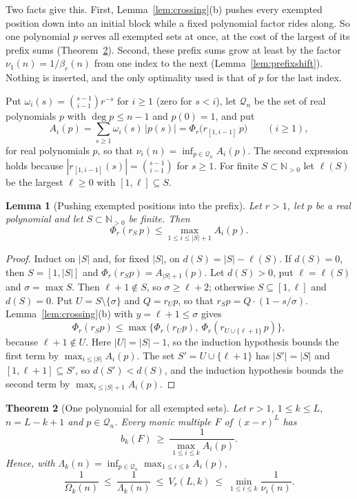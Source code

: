 \documentclass[11pt]{article}
\newtheorem{theorem}{Theorem}[section]
\newtheorem{lemma}[theorem]{Lemma}
\newcommand{\N}{\mathbb N}
\begin{document}
Two facts give this.  First, Lemma~\ref{lem:crossing}(b) pushes every
exempted position down into an initial block while a fixed polynomial factor
rides along.  So one polynomial $p$ serves all exempted sets at once, at the
cost of the largest of its prefix sums (Theorem~\ref{thm:onepoly}).  Second,
these prefix sums grow at least by the factor $\nu_1(n)=1/\beta_r(n)$ from
one index to the next (Lemma~\ref{lem:prefixshift}).  Nothing is inserted,
and the only optimality used is that of $p$ for the last index.

Put $\omega_i(s)=\binom{s-1}{i-1}r^{-s}$ for $i\ge1$ (zero for $s<i$),
let $\mathcal Q_n$ be the set of real polynomials $p$ with
$\deg p\le n-1$ and $p(0)=1$, and put
\[
  A_i(p)=\sum_{s\ge1}\omega_i(s)\,|p(s)|=\Phi_r\bigl(r_{[1,i-1]}\,p\bigr)
  \qquad(i\ge1),
\]
for real polynomials $p$, so that $\nu_i(n)=\inf_{p\in\mathcal Q_n}A_i(p)$.
The second expression holds because $|r_{[1,i-1]}(s)|=\binom{s-1}{i-1}$
for $s\ge1$.  For finite $S\subset\N_{>0}$ let $\ell(S)$ be the largest
$\ell\ge0$ with $[1,\ell]\subseteq S$.

\begin{lemma}[Pushing exempted positions into the prefix]\label{lem:prefixpush}
Let $r>1$, let $p$ be a real polynomial and let $S\subset\N_{>0}$ be finite.
Then
\[
  \Phi_r(r_S\,p)\le\max_{1\le i\le|S|+1}A_i(p).
\]
\end{lemma}

\begin{proof}
Induct on $|S|$ and, for fixed $|S|$, on $d(S)=|S|-\ell(S)$.  If $d(S)=0$,
then $S=[1,|S|]$ and $\Phi_r(r_Sp)=A_{|S|+1}(p)$.  Let $d(S)>0$, put
$\ell=\ell(S)$ and $\sigma=\max S$.  Then $\ell+1\notin S$, so
$\sigma\ge\ell+2$; otherwise $S\subseteq[1,\ell]$ and $d(S)=0$.  Put
$U=S\setminus\{\sigma\}$ and $Q=r_Up$, so that $r_Sp=Q\cdot(1-s/\sigma)$.
Lemma~\ref{lem:crossing}(b) with $y=\ell+1\le\sigma$ gives
\[
  \Phi_r(r_Sp)\le\max\bigl\{\Phi_r(r_Up),\ \Phi_r(r_{U\cup\{\ell+1\}}\,p)\bigr\},
\]
because $\ell+1\notin U$.  Here $|U|=|S|-1$, so the induction hypothesis
bounds the first term by $\max_{i\le|S|}A_i(p)$.  The set
$S'=U\cup\{\ell+1\}$ has $|S'|=|S|$ and $[1,\ell+1]\subseteq S'$, so
$d(S')<d(S)$, and the induction hypothesis bounds the second term by
$\max_{i\le|S|+1}A_i(p)$.
\end{proof}

\begin{theorem}[One polynomial for all exempted sets]\label{thm:onepoly}
Let $r>1$, $1\le k\le L$, $n=L-k+1$ and $p\in\mathcal Q_n$.  Every monic
multiple $F$ of $(x-r)^L$ has
\[
  b_k(F)\ \ge\ \frac1{\max_{1\le i\le k}A_i(p)} .
\]
Hence, with $\Lambda_k(n)=\inf_{p\in\mathcal Q_n}\max_{1\le i\le k}A_i(p)$,
\[
  \frac1{\Omega_k(n)}\ \le\ \frac1{\Lambda_k(n)}\ \le\ V_r(L,k)\ \le\
  \min_{1\le i\le k}\frac1{\nu_i(n)} .
\]
\end{theorem}
\end{document}
